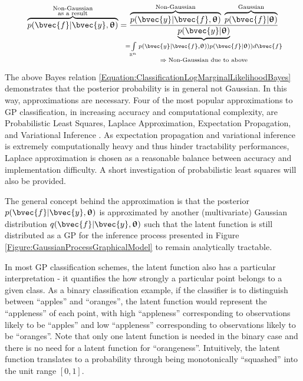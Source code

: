 		\begin{equation}
			\overbrace{p(\bvec{f} | \bvec{y}, \vec{\uptheta})}^{\mathclap{\substack{\text{Non-Gaussian} \\ \text{as a result}}}} = \frac{\overbrace{p(\bvec{y} | \bvec{f}, \vec{\uptheta})}^{\text{Non-Gaussian}} \; \overbrace{p(\bvec{f} | \vec{\uptheta})}^{\text{Gaussian}}}{\underbrace{p(\bvec{y} | \vec{\uptheta})}_{\mathclap{\substack{= \int\limits_{\mathbb{R}^{n}} p(\bvec{y} | \bvec{f}, \vec{\uptheta})) p(\bvec{f} | \vec{\uptheta})) d\bvec{f} \\ \Rightarrow \; \text{Non-Gaussian due to above}}}}}
		\label{Equation:ClassificationLogMarginalLikelihoodBayes}
		\end{equation}

		The above Bayes relation \eqref{Equation:ClassificationLogMarginalLikelihoodBayes} demonstrates that the posterior probability is in general not Gaussian. In this way, approximations are necessary. Four of the most popular approximations to GP classification, in increasing accuracy and computational complexity, are Probabilistic Least Squares, Laplace Approximation, Expectation Propagation, and Variational Inference \citep{GaussianProcessForMachineLearning}. As expectation propagation and variational inference is extremely computationally heavy and thus hinder tractability performances, Laplace approximation is chosen as a reasonable balance between accuracy and implementation difficulty. A short investigation of probabilistic least squares will also be provided.
		
		The general concept behind the approximation is that the posterior $p(\bvec{f} | \bvec{y}, \vec{\uptheta})$ is approximated by another (multivariate) Gaussian distribution $q(\bvec{f} | \bvec{y}, \vec{\uptheta})$ such that the latent function is still distributed as a GP for the inference process presented in Figure \ref{Figure:GaussianProcessGraphicalModel} to remain analytically tractable.
		
		In most GP classification schemes, the latent function also has a particular interpretation - it quantifies the how strongly a particular point belongs to a given class. As a binary classification example, if the classifier is to distinguish between ``apples'' and ``oranges'', the latent function would represent the ``appleness'' of each point, with high ``appleness'' corresponding to observations likely to be ``apples'' and low ``appleness'' corresponding to observations likely to be ``oranges''. Note that only one latent function is needed in the binary case and there is no need for a latent function for ``orangeness''. Intuitively, the latent function translates to a probability through being monotonically ``squashed'' into the unit range $[0, 1]$.
		
